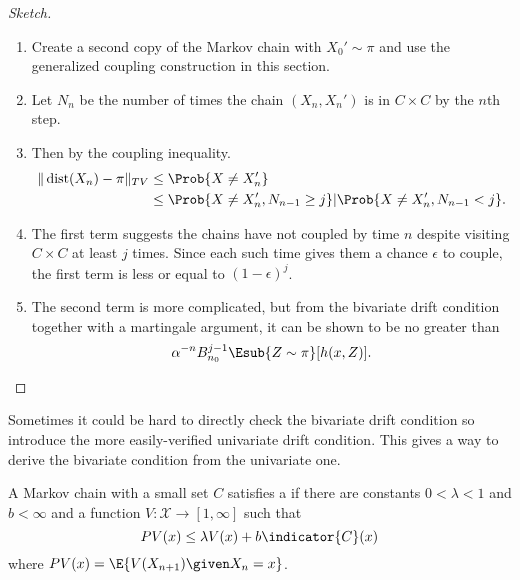 \documentclass[12pt]{article}
\begin{document}
\begin{proof}[Sketch]
    \begin{enumerate}
        \item
            Create a second copy of the Markov chain with \( X_0' \sim
            \pi \) and use the generalized coupling construction in this
            section.
        \item
            Let \( N_n \) be the number of times the chain \( (X_n, X_n')
            \) is in \( C \times C \) by the \( n \)th step.
        \item
            Then by the coupling inequality.
            \begin{align*}
                \|
                \operatorname{dist}
                (X_n) - \pi \|_{TV} &\le \Prob{X \ne X_n'} \\
                &\le \Prob{X \ne X_n', N_{n-1} \ge j} | \Prob{X \ne X_n',
                N_{n-1} <j}.
            \end{align*}
        \item
            The first term suggests the chains have not coupled by time \(
            n \) despite visiting \( C \times C \) at least \( j \)
            times.  Since each such time gives them a chance \( \epsilon
            \) to couple, the first term is less or equal to \( (1 -
            \epsilon)^j \).
        \item
            The second term is more complicated, but from the bivariate
            drift condition together with a martingale argument, it can
            be shown to be no greater than
            \[
                \alpha^{-n} B_{n_0}^{j-1} \Esub{Z \sim \pi}[h(x,Z)].
            \]
    \end{enumerate}
\end{proof}

Sometimes it could be hard to directly check the bivariate drift
condition so introduce the more easily-verified univariate drift
condition.  This gives a way to derive the bivariate condition from the
univariate one.

\begin{definition}
    A Markov chain with a small set \( C \) satisfies a %
    if there are constants \( 0 < \lambda < 1 \) and \( b < \infty \)
    and a function \( V :  \mathcal{X} \to [1, \infty] \) such that
    \[
        PV(x) \le \lambda V(x) + b \indicator{C}(x)
    \] where \( PV(x) = \E{V(X_{n+1}) \given X_n = x} \).
\end{definition}
\end{document}
